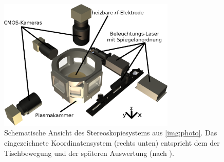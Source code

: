 \documentclass[numbers=noenddot,a4paper,notitlepage,twoside,BCOR15mm]{scrbook}
\begin{document}
				\begin{figure}[!t]
					\centering
					\includegraphics[width=0.75\textwidth,height=0.55\textwidth]{figs/witharrowsnunu.png}
					\caption{Schematische Ansicht des Stereoskopiesystems aus \ref{img:photo}. Das eingezeichnete Koordinatensystem (rechts unten) entspricht dem der Tischbewegung und der späteren Auswertung (nach \cite{Mulsow13}).}
					\label{img:plasmakammer}
				\end{figure}
\end{document}
